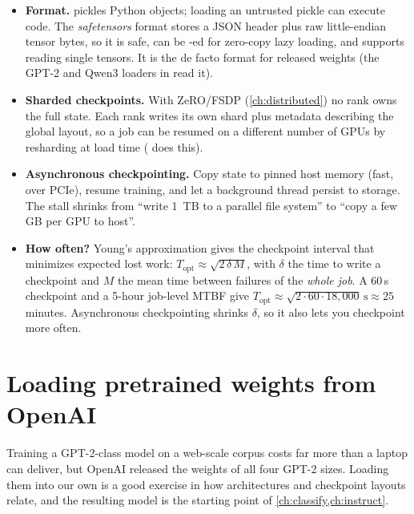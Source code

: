 \begin{systemslens}
\begin{itemize}
\item \textbf{Format.}  pickles Python objects; loading an untrusted pickle can
  execute code. The \emph{safetensors} format stores a JSON header plus raw little-endian tensor
  bytes, so it is safe, can be -ed for zero-copy lazy loading, and supports reading
  single tensors. It is the de facto format for released weights (the GPT-2 and Qwen3 loaders in
   read it).
\item \textbf{Sharded checkpoints.} With ZeRO/FSDP (\cref{ch:distributed}) no rank owns the full
  state. Each rank writes its own shard plus metadata describing the global layout, so a job
  can be resumed on a different number of GPUs by resharding at load time
  ( does this).
\item \textbf{Asynchronous checkpointing.} Copy state to pinned host memory (fast, over PCIe),
  resume training, and let a background thread persist to storage. The stall shrinks from
  ``write \SI{1}{TB} to a parallel file system'' to ``copy a few GB per GPU to host''.
\item \textbf{How often?} Young's approximation gives the checkpoint interval that minimizes
  expected lost work: $T_{\text{opt}}\approx\sqrt{2\,\delta\,M}$, with $\delta$ the time to write
  a checkpoint and $M$ the mean time between failures of the \emph{whole job}. A 60\,s
  checkpoint and a 5-hour job-level MTBF give $T_{\text{opt}}\approx\sqrt{2\cdot60\cdot18{,}000}\,\text{s}
  \approx 25$ minutes. Asynchronous checkpointing shrinks $\delta$, so it also lets you
  checkpoint more often.
\end{itemize}
\end{systemslens}

\section{Loading pretrained weights from OpenAI}\label{sec:pretrain:gpt2}

Training a GPT-2-class model on a web-scale corpus costs far more than a laptop can deliver,
but OpenAI released the weights of all four GPT-2 sizes. Loading them into our own
 is a good exercise in how architectures and checkpoint layouts relate, and the
resulting model is the starting point of \cref{ch:classify,ch:instruct}.

